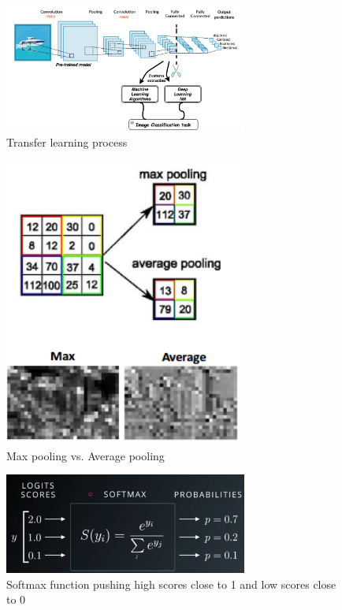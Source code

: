 \documentclass[twocolumn]{article}
\begin{document}
\begin{figure}[h]
\centering
\includegraphics[width=8cm]{./figures/transfer learning process}
\caption{Transfer learning process}
\end{figure}

\begin{figure}[h]
\centering
\includegraphics[width=8cm]{./figures/max pooling vs. average pooling}
\caption{Max pooling vs. Average pooling}
\end{figure}

\begin{figure}[h]
\centering
\includegraphics[width=8cm]{./figures/softmax function}
\caption{Softmax function pushing high scores close to 1 and low scores close to 0}
\end{figure}
\end{document}

